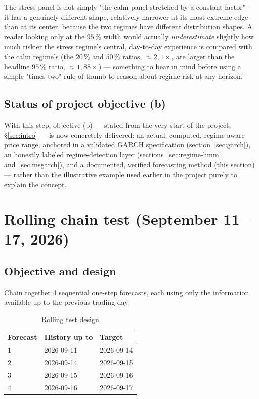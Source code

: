 \documentclass[12pt,a4paper]{article}
\begin{document}
\begin{econbox}
	The stress panel is not simply "the
	calm panel stretched by a constant factor" --- it has a
	genuinely different shape, relatively narrower at its most
	extreme edge than at its center, because the two regimes have
	different distribution shapes. A reader looking only at the
	$95\,\%$ width would actually \emph{underestimate} slightly
	how much riskier the stress regime's central, day-to-day
	experience is compared with the calm regime's (the $20\,\%$ and $50\,\%$
	ratios, $\approx 2{,}1\times$, are larger than the headline $95\,\%$
	ratio, $\approx 1{,}88\times$) --- something to bear in mind before using a simple
	"times two" rule of thumb to reason about regime risk at
	any horizon.
\end{econbox}


\subsection{Status of project objective (b)}

With this step, objective (b) --- stated from the very start of the project,
\S\ref{sec:intro} --- is now concretely delivered: an
actual, computed, regime-aware price range, anchored in a
validated GARCH specification (section~\ref{sec:garch}), an honestly
labeled regime-detection layer
(sections~\ref{sec:regime-hmm} and~\ref{sec:msgarch}), and a
documented, verified forecasting method (this section) --- rather than the
illustrative example used earlier in the project purely to explain the
concept.

\newpage

\section{Rolling chain test (September 11--17, 2026)}
\label{sec:rolling-test}

\subsection{Objective and design}

Chain together 4 sequential one-step forecasts, each using only
the information available up to the previous trading day:

\begin{table}[H]
	\centering
	\caption{Rolling test design}
	\begin{tabular}{lll}
		\toprule
		Forecast & History up to & Target \\
		\midrule
		1 & 2026-09-11 & 2026-09-14 \\
		2 & 2026-09-14 & 2026-09-15 \\
		3 & 2026-09-15 & 2026-09-16 \\
		4 & 2026-09-16 & 2026-09-17 \\
		\bottomrule
	\end{tabular}
\end{table}
\end{document}
